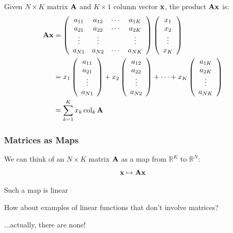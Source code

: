 \begin{frame}
    \vspace{2em}
    Given $N \times K$ matrix $\mathbf A$ and $K \times 1$ column
    vector ${\mathbf x}$, the product $\mathbf A {\mathbf x}$ is:
    \begin{align*}
        \mathbf A {\mathbf x}
        & = 
        \left(
        \begin{array}{cccc}
            a_{11} & a_{12} & \cdots & a_{1K} \\
            a_{21} & a_{22} & \cdots & a_{2K} \\
            \vdots & \vdots &  & \vdots \\
            a_{N1} & a_{N2} & \cdots & a_{NK} 
        \end{array}
        \right)
        \left(
        \begin{array}{c}
            x_1 \\
            x_2 \\
            \vdots \\
            x_K
        \end{array}
        \right)
        \\
        & =
        x_1 \left(
        \begin{array}{c}
            a_{11} \\
            a_{21} \\
            \vdots \\
            a_{N1} 
        \end{array}
        \right)
        +
        x_2 \left(
        \begin{array}{c}
            a_{12} \\
            a_{22} \\
            \vdots \\
            a_{N2} 
        \end{array}
        \right)
        + \cdots + 
        x_K \left(
        \begin{array}{c}
            a_{1K} \\
            a_{2K} \\
            \vdots \\
            a_{NK} 
        \end{array}
        \right)
        \\
        & = 
        \sum_{k=1}^K x_k \operatorname{col}_k \mathbf A
    \end{align*}
%
\end{frame}

\begin{frame}\frametitle{Matrices as Maps}

    \vspace{2em}
    We can think of an $N\times K$ matrix $\mathbf A$ as a map from
    $\mathbb{R}^{K}$ to $\mathbb{R}^{N}$:
    \[
        {\mathbf x} \mapsto \mathbf A{\mathbf x} 
    \]
    
    Such a map is linear
    
    \vspace{.7em}
    How about examples of linear functions that don't involve matrices? 
    
    ...actually, there are none! 
    
\end{frame}

